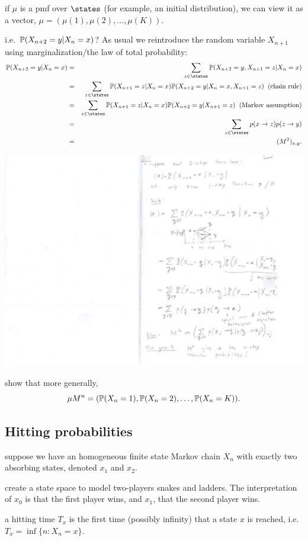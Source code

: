 \documentclass{article}
\begin{document}
 if $\mu$ is a pmf over $\states$ (for example, an initial distribution), we can view it as a vector, $\mu = (\mu(1), \mu(2), \dots, \mu(K))$. 

 i.e. $\P(X_{n+2} = y | X_n = x)$? As usual we reintroduce the random variable $X_{n+1}$ using marginalization/the law of total probability:
\begin{eqnarray*}
\P(X_{n+2} = y | X_n = x) &=& \sum_{z \in \states} \P(X_{n+2} = y, X_{n+1} = z | X_n = x) \\
&=& \sum_{z \in \states} \P(X_{n+1} = z | X_n = x) \P(X_{n+2} = y | X_n = x, X_{n+1} = z) \;\;(\text{chain rule}) \\
&=& \sum_{z \in \states} \P(X_{n+1} = z | X_n = x) \P(X_{n+2} = y | X_{n+1} = z) \;\;(\text{Markov assumption}) \\
&=& \sum_{z \in \states} p(x \to z) p(z \to y) \\
&=& (M^2)_{x,y}.
\end{eqnarray*} 
\begin{center}
	\includegraphics[width=0.4\linewidth]{figures/kolm-chap} 
\end{center}

 show that more generally, \[\mu M^n = (\P(X_n = 1), \P(X_n = 2), \dots, \P(X_n = K)).\]


\subsection{Hitting probabilities}

 suppose we have an homogeneous finite state Markov chain $X_n$ with exactly two absorbing states, denoted $x_1$ and $x_2$.

 create a state space to model two-players snakes and ladders. The interpretation of $x_0$ is that the first player wins, and $x_1$, that the second player wins. 

 a hitting time $T_x$ is the first time (possibly infinity) that a state $x$ is reached, i.e. $T_x = \inf \{n : X_n = x\}$. 
\end{document}
